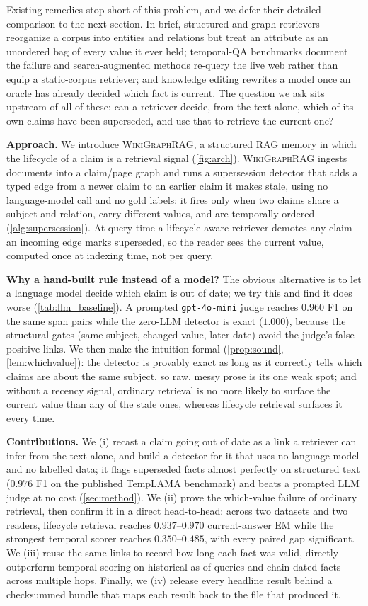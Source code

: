 \documentclass[letterpaper]{article}
\theoremstyle{plain}
\newcommand{\ours}{\textsc{WikiGraphRAG}}
\begin{document}
\noindent Existing remedies stop short of this problem, and we defer their detailed comparison to the next section. In brief, structured and graph retrievers reorganize a corpus into entities and relations but treat an attribute as an unordered bag of every value it ever held; temporal-QA benchmarks document the failure and search-augmented methods re-query the live web rather than equip a static-corpus retriever; and knowledge editing rewrites a model once an oracle has already decided which fact is current. The question we ask sits upstream of all of these: can a retriever decide, from the text alone, which of its own claims have been superseded, and use that to retrieve the current one?

\noindent\textbf{Approach.} We introduce \ours{}, a structured RAG memory in which the lifecycle of a claim is a retrieval signal (\cref{fig:arch}). \ours{} ingests documents into a claim/page graph and runs a supersession detector that adds a typed edge from a newer claim to an earlier claim it makes stale, using no language-model call and no gold labels: it fires only when two claims share a subject and relation, carry different values, and are temporally ordered (\cref{alg:supersession}). At query time a lifecycle-aware retriever demotes any claim an incoming edge marks superseded, so the reader sees the current value, computed once at indexing time, not per query.

\noindent\textbf{Why a hand-built rule instead of a model?} The obvious alternative is to let a language model decide which claim is out of date; we try this and find it does worse (\cref{tab:llm_baseline}). A prompted \texttt{gpt-4o-mini} judge reaches $0.960$ F1 on the same span pairs while the zero-LLM detector is exact ($1.000$), because the structural gates (same subject, changed value, later date) avoid the judge's false-positive links. We then make the intuition formal (\cref{prop:sound}, \cref{lem:whichvalue}): the detector is provably exact as long as it correctly tells which claims are about the same subject, so raw, messy prose is its one weak spot; and without a recency signal, ordinary retrieval is no more likely to surface the current value than any of the stale ones, whereas lifecycle retrieval surfaces it every time.

\noindent\textbf{Contributions.} We (i) recast a claim going out of date as a link a retriever can infer from the text alone, and build a detector for it that uses no language model and no labelled data; it flags superseded facts almost perfectly on structured text ($0.976$ F1 on the published TempLAMA benchmark) and beats a prompted LLM judge at no cost (\cref{sec:method}). We (ii) prove the which-value failure of ordinary retrieval, then confirm it in a direct head-to-head: across two datasets and two readers, lifecycle retrieval reaches $0.937$--$0.970$ current-answer EM while the strongest temporal scorer reaches $0.350$--$0.485$, with every paired gap significant. We (iii) reuse the same links to record how long each fact was valid, directly outperform temporal scoring on historical as-of queries and chain dated facts across multiple hops. Finally, we (iv) release every headline result behind a checksummed bundle that maps each result back to the file that produced it.
\end{document}
